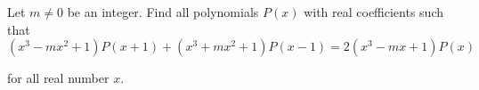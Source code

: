 Let 
$m \neq 0 $
 be an integer. Find all polynomials 
$P(x) $
 with real coefficients such that
\[ (x^3 - mx^2 +1 ) P(x+1)  + (x^3+mx^2+1) P(x-1) =2(x^3 - mx +1 ) P(x) \]


for all real number 
$x$.
